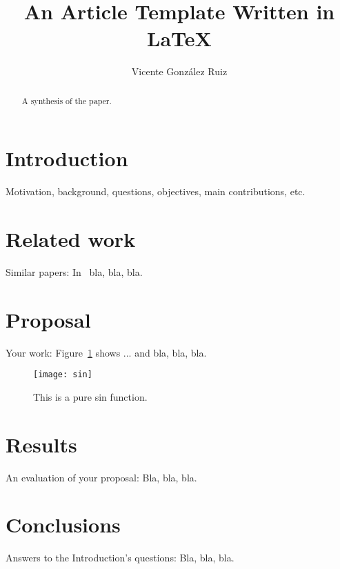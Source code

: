 \documentclass[11pt,twoside,a4paper]{article}
\begin{document}
\title{An Article Template Written in {\color{red}\LaTeX}}
\author{Vicente Gonz\'alez Ruiz}
\maketitle

\begin{abstract}
A synthesis of the paper.
\end{abstract}

\section{Introduction}
Motivation, background, questions, objectives, main contributions, etc.

\section{Related work}
Similar papers: In~\cite{greenwade93} bla, bla, bla.

\section{Proposal}
Your work: Figure~\ref{fig:sin} shows ... and bla, bla, bla.

\begin{figure}
  \begin{center}
    \texttt{[image: sin]}
  \end{center}
  \caption{This is a pure sin function.\label{fig:sin}}
\end{figure}

\section{Results}
An evaluation of your proposal: Bla, bla, bla.

\section{Conclusions}
Answers to the Introduction's questions: Bla, bla, bla.



\end{document}
